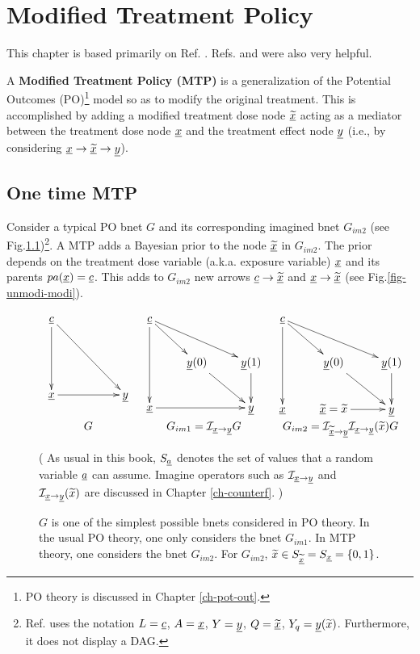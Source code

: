 \chapter{Modified Treatment Policy}
\label{ch-modi-treat}

This chapter is based
primarily on Ref. \cite{han-rot-2013}.
Refs.
\cite{hernan-book}
and \cite{khstats-mtp}
were also very helpful.


A {\bf Modified Treatment Policy (MTP)}
is a generalization
of the Potential
Outcomes (PO)\footnote{PO theory
is discussed in Chapter
 \ref{ch-pot-out}.} model
so as to
modify the original treatment.
This is accomplished
by adding a modified treatment
dose node $\underline{{\widetilde{x}}}$
acting as a mediator
between the treatment dose node 
${\underline{x}}$ and the treatment effect node ${\underline{y}}$ (i.e., by considering
${\underline{x}}\rightarrow\underline{{\widetilde{x}}}\rightarrow {\underline{y}}$).

\section{One time MTP}
Consider a typical PO bnet $G$
and its corresponding imagined bnet $G_{im2}$ (see Fig.\ref{fig-modi-po})\footnote{ Ref.\cite{han-rot-2013} uses the
notation $L = {\underline{c}}$,
$A = {\underline{x}}$, $Y={\underline{y}}$, $Q=\underline{{\widetilde{x}}}$,
$Y_q={\underline{y}}({\widetilde{x}})$. Furthermore, it does not 
display a DAG.
}.
A MTP adds a Bayesian prior to the
 node $\underline{{\widetilde{x}}}$ in $G_{im2}$.
The prior depends on the treatment
dose variable (a.k.a. exposure variable) ${\underline{x}}$ and its parents $pa({\underline{x}})={\underline{c}}$.
This adds 
to $G_{im2}$  new arrows ${\underline{c}}\rightarrow\underline{{\widetilde{x}}}$
and ${\underline{x}}\rightarrow \underline{{\widetilde{x}}}$ (see Fig.\ref{fig-unmodi-modi}).


\begin{figure}[h!]
$$
\begin{array}{ccc}
\xymatrix{
\rvc
\ar[dd]\ar[ddrr]
\\
\\
\rvx \ar[rr]
&
&\rvy
}
&
\xymatrix{
\rvc
\ar[dd]\ar[dr] \ar[drr]
\\
& \rvy(0)\ar[dr]
&\rvy(1)\ar[d]
\\
\rvx\ar[rr]
&
&\rvy
}
&
\xymatrix{
\rvc
\ar[dd]\ar[dr] \ar[drr]
\\
& \rvy(0)\ar[dr]
&\rvy(1)\ar[d]
\\
\rvx
&\ul{\tilx}=\tilx\ar[r]
&\rvy
}
\\
G
&G_{im1} =\cali_{\rvx\rarrow\rvy} G
& G_{im2}=\cali_{\ul{\tilx}\rarrow\rvy}\cali_{\rvx\rarrow\rvy}(\tilx)G
\end{array}
$$
\caption{$G$ is one of the
simplest possible bnets considered in  PO theory.
In the usual PO theory,
one only considers the bnet $G_{im1}$.
In MTP theory, one
considers the bnet $G_{im2}$.
For $G_{im2}$, ${\widetilde{x}}\in S_{\underline{{\widetilde{x}}}}= 
S_{\underline{x}}=\{0,1\}$.} (
As usual in this book, $S_{\underline{a}}$
denotes the set of
values that a random variable
${\underline{a}}$ can assume.
Imagine operators such as
${\cal I}_{{\underline{x}}\rightarrow {\underline{y}}}$
and ${\cal I}_{{\underline{x}}\rightarrow {\underline{y}}}({\widetilde{x}})$ 
are discussed in Chapter \ref{ch-counterf}.
)
\label{fig-modi-po}
\end{figure}


